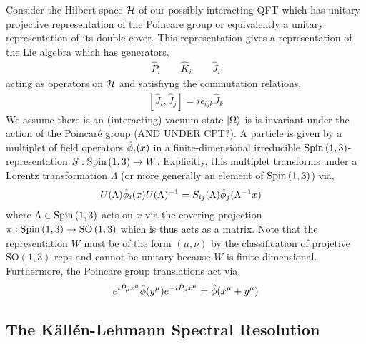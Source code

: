 \documentclass[12pt]{extarticle}
\theoremstyle{definition}
\newcommand{\SO}[1]{\mathrm{SO}\left(#1\right)}
\begin{document}
Consider the Hilbert space $\mathcal{H}$ of our possibly interacting QFT which has unitary projective representation of the Poincare group or equivalently  a unitary representation of its double cover. This representation gives a representation of the Lie algebra which has generators,
\begin{subequations}
\begin{align}
\hat{P}_i
\quad \quad
\hat{K}_i
\quad \quad
\hat{J}_i
\end{align}
\end{subequations}
acting as operators on $\mathcal{H}$ and satisfiyng the commutation relations, 
\begin{subequations}
\begin{align}
[\hat{J}_i, \hat{J}_j] = i \epsilon_{ijk} \hat{J}_k
\end{align}
\end{subequations}
We assume there is an (interacting) vacuum state $\left| \Omega \right>$ is is invariant under the action of the Poincar\'{e} group (AND UNDER CPT?).
A particle is given by a multiplet of field operators $\hat{\phi}_i(x)$ in a finite-dimensional irreducible $\mathrm{Spin}\left( 1,3 \right)$-representation $S : \mathrm{Spin}\left( 1,3 \right) \to W$. Explicitly,  this multiplet transforms under a Lorentz transformation $\Lambda$ (or more generally an element of $\mathrm{Spin}\left( 1,3 \right)$) via,
\begin{subequations}
\begin{align}
U(\Lambda) \hat{\phi}_i(x) U(\Lambda)^{-1} & = S_{ij}(\Lambda) \hat{\phi}_j(\Lambda^{-1} x)
\end{align}
\end{subequations}
where $\Lambda \in \mathrm{Spin}\left( 1,3 \right)$ acts on $x$ via the covering projection $\pi : \Spin{1,3} \to \SO{1,3}$ which is thus acts as a matrix. Note that the representation $W$ must be of the form $(\mu, \nu)$ by the classification of projetive $\SO{1,3}$-reps and cannot be unitary because $W$ is finite dimensional. Furthermore, the Poincare group translations act via,
\[ e^{i \hat{P}_\mu x^\mu} \hat{\phi}(y^\mu) e^{- i \hat{P}_\mu x^\mu} = \hat{\phi}(x^\mu + y^\mu)  \]

\subsection{The K\"{a}ll\'{e}n-Lehmann Spectral Resolution}
\end{document}

